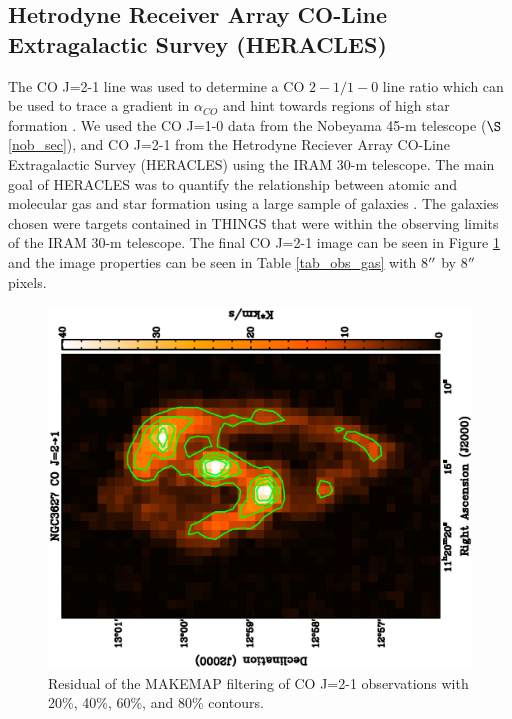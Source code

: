 
\subsection{Hetrodyne Receiver Array CO-Line Extragalactic Survey (HERACLES)}

The CO J=2-1 line was used to determine a CO ${2-1} / {1-0}$ line ratio which can be used to trace a gradient in $\alpha_{CO}$ and hint towards regions of high star formation \citep{reuter1996}.  We used the CO J=1-0 data from the Nobeyama 45-m telescope ($\S$ \ref{nob_sec}), and CO J=2-1 from the Hetrodyne Reciever Array CO-Line Extragalactic Survey (HERACLES) using the IRAM 30-m telescope.  The main goal of HERACLES was to quantify the relationship between atomic and molecular gas and star formation using a large sample of galaxies \citep{leroy2009}.  The galaxies chosen were targets contained in THINGS that were within the observing limits of the IRAM 30-m telescope.  The final CO J=2-1 image can be seen in Figure \ref{fig_co21} and the image properties can be seen in Table \ref{tab_obs_gas} with 8$\mbox{$^{\prime\prime}$}$ by 8$\mbox{$^{\prime\prime}$}$ pixels.

\begin{figure}
  \centering

  \includegraphics[width=1.\textwidth, angle=270]{obs_imgs/21_rem.eps}
  \caption[NGC3627 CO J=2-1 Observations]{Residual of the MAKEMAP filtering of CO J=2-1 observations with 20\%, 40\%, 60\%, and 80\% contours.}
  \label{fig_co21}
\end{figure}

